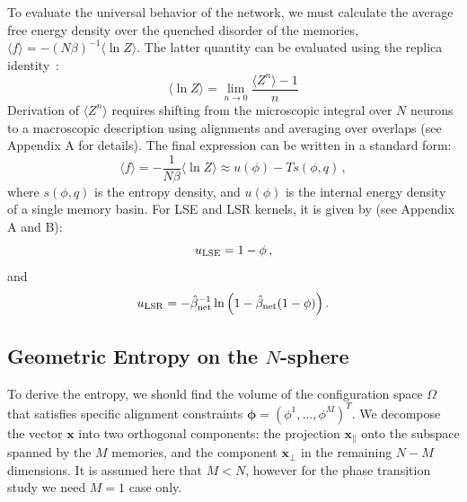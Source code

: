 \documentclass{article}
\theoremstyle{plain}
\theoremstyle{definition}
\theoremstyle{remark}
\begin{document}
To evaluate the universal behavior of the network, we must calculate the average free energy density over the quenched disorder of the memories, $\langle f \rangle = -(N\beta)^{-1} \langle \ln Z \rangle$. The latter quantity can be evaluated using the replica identity~\cite{sk75}:
\begin{equation}
    \langle \ln Z \rangle = \lim_{n \to 0} \frac{\langle Z^n \rangle - 1}{n}
    \label{eq:limit}
\end{equation}
Derivation of $\langle Z^n \rangle$ requires shifting from the microscopic integral over $N$ neurons to a macroscopic description using alignments and averaging over overlaps (see Appendix A for details). The final expression can be written in a standard form:
\begin{equation}
    \langle f \rangle = -\frac{1}{N\beta} \langle \ln Z \rangle 
    \approx  u(\phi) - T s(\phi, q)\,,
\end{equation}
where  $s(\phi, q)$ is the entropy density, and $u(\phi)$ is the internal energy density of a single memory basin. For LSE and LSR kernels, it is given by (see Appendix A and B):
\begin{equation}
    u_{\rm LSE} = 1-\phi\,,
\end{equation}
and 
\begin{equation}
    u_{\rm LSR} = -\hat\beta^{-1}_{\rm net} \ln \Big(1 - \hat\beta_{\rm net} (1-\phi) \Big)\,.
\end{equation}

\subsection{Geometric Entropy on the $N$-sphere}

To derive the entropy, we should find the volume of the configuration space $\Omega$ that satisfies specific alignment constraints $\bm{\phi} = (\phi^1, \dots, \phi^M)^T$. We decompose the vector $\bm{x}$ into two orthogonal components: the projection $\bm{x}_{\parallel}$ onto the subspace spanned by the $M$ memories, and the component $\bm{x}_{\perp}$ in the remaining $N-M$ dimensions. It is assumed here that $M<N$, however for the phase transition study we need $M=1$ case only.
\end{document}
